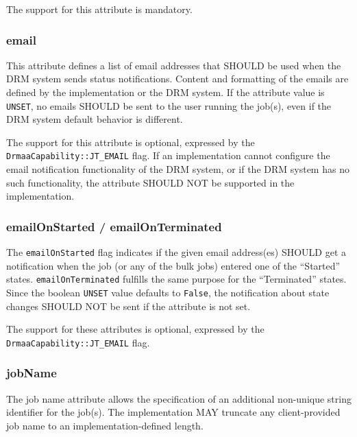 \documentclass{article}
\newcommand{\h}[1]{\lstinline|#1|}
\newcommand{\rat}[1]{}
\begin{document}
The support for this attribute is mandatory.

\subsubsection{email}

This attribute defines a list of email addresses that SHOULD be used when the DRM system sends status notifications. Content and formatting of the emails are defined by the implementation or the DRM system. If the attribute value is \h{UNSET}, no emails SHOULD be sent to the user running the job(s), even if the DRM system default behavior is different.

The support for this attribute is optional, expressed by the \h{DrmaaCapability::JT_EMAIL} flag. If an implementation cannot configure the email notification functionality of the DRM system, or if the DRM system has no such functionality, the attribute SHOULD NOT be supported in the implementation.

\rat{
The blockEmail attribute in the JobTemplate was replaced by the UNSET semantic for the email addresses. (conf. call July 28th 2010). This became an optional attribute, since we mandate the ``switch off'' semantic in case of \h{UNSET}.
}

\subsubsection{emailOnStarted / emailOnTerminated}

The \h{emailOnStarted} flag indicates if the given email address(es) SHOULD get a notification when the job (or any of the bulk jobs) entered one of the \enquote{Started} states. \h{emailOnTerminated} fulfills the same purpose for the ``Terminated'' states. Since the boolean \h{UNSET} value defaults to \h{False}, the notification about state changes SHOULD NOT be sent if the attribute is not set. 

The support for these attributes is optional, expressed by the \h{DrmaaCapability::JT_EMAIL} flag.

\subsubsection{jobName}

The job name attribute allows the specification of an additional non-unique string identifier for the job(s). The  implementation MAY truncate any client-provided job name to an implementation-defined length.
\end{document}
